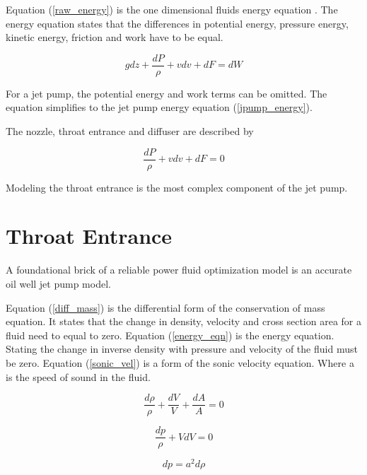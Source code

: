 \documentclass{article}
\begin{document}
Equation (\ref{raw_energy}) is the one dimensional fluids energy equation \cite{fluids_cheme}. The energy equation states that the differences in potential energy, pressure energy, kinetic energy, friction and work have to be equal.

\begin{equation}
gdz + \frac{dP}{\rho} + vdv + dF = dW
\label{raw_energy}
\end{equation}

For a jet pump, the potential energy and work terms can be omitted. The equation simplifies to the jet pump energy equation (\ref{jpump_energy}).

The nozzle, throat entrance and diffuser are described by

\begin{equation}
\frac{dP}{\rho} + vdv + dF = 0
\label{jpump_energy}
\end{equation}

Modeling the throat entrance is the most complex component of the jet pump.

\section{Throat Entrance}



A foundational brick of a reliable power fluid optimization model is an accurate oil well jet pump model.

Equation (\ref{diff_mass}) is the differential form of the conservation of mass equation. It states that the change in density, velocity and cross section area for a fluid need to equal to zero. Equation (\ref{energy_eqn}) is the energy equation. Stating the change in inverse density with pressure and velocity of the fluid must be zero. Equation (\ref{sonic_vel}) is a form of the sonic velocity equation. Where a is the speed of sound in the fluid.

\begin{equation}
\frac{d\rho}{\rho} + \frac{dV}{V} + \frac{dA}{A} = 0
\label{diff_mass}
\end{equation}

\begin{equation}
\frac{dp}{\rho} + VdV = 0
\label{energy_eqn}
\end{equation}

\begin{equation}
dp = a^2d\rho
\label{sonic_vel}
\end{equation}
\end{document}

